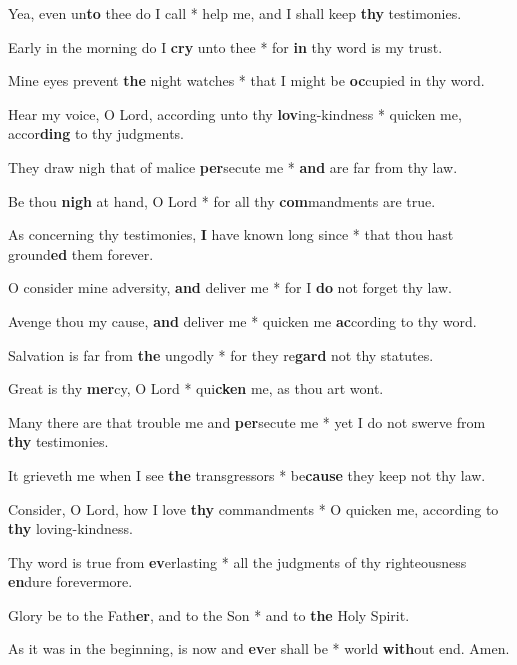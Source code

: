 \begin{multicols}{2}
	Yea, even un\textbf{to} thee do I call * help me, and I shall keep \textbf{thy} testimonies.
	
	Early in the morning do I \textbf{cry} unto thee * for \textbf{in} thy word is my trust.
	
	Mine eyes prevent \textbf{the} night watches * that I might be \textbf{oc}cupied in thy word.
	
	Hear my voice, O Lord, according unto thy \textbf{lov}ing-kindness * quicken me, accor\textbf{ding} to thy judgments.
	
	They draw nigh that of malice \textbf{per}secute me * \textbf{and} are far from thy law.
	
	Be thou \textbf{nigh} at hand, O Lord * for all thy \textbf{com}mandments are true.
	
	As concerning thy testimonies, \textbf{I} have known long since * that thou hast ground\textbf{ed} them forever.
	
	O consider mine adversity, \textbf{and} deliver me * for I \textbf{do} not forget thy law.
	
	Avenge thou my cause, \textbf{and} deliver me * quicken me \textbf{ac}cording to thy word.
	
	Salvation is far from \textbf{the} ungodly * for they re\textbf{gard} not thy statutes.
	
	Great is thy \textbf{mer}cy, O Lord * qui\textbf{cken} me, as thou art wont.
	
	Many there are that trouble me and \textbf{per}secute me * yet I do not swerve from \textbf{thy} testimonies.
	
	It grieveth me when I see \textbf{the} transgressors * be\textbf{cause} they keep not thy law.
	
	Consider, O Lord, how I love \textbf{thy} commandments * O quicken me, according to \textbf{thy} loving-kindness.
	
	Thy word is true from \textbf{ev}erlasting * all the judgments of thy righteousness \textbf{en}dure forevermore.
	
	Glory be to the Fath\textbf{er}, and to the Son * and to \textbf{the} Holy Spirit.
	
	As it was in the beginning, is now and \textbf{ev}er shall be * world \textbf{with}out end. Amen.
\end{multicols}